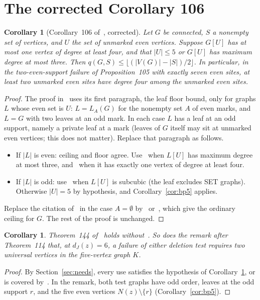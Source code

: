 \documentclass[11pt]{amsart}
\newtheorem{corollary}[theorem]{Corollary}
\theoremstyle{definition}
\begin{document}
\section{The corrected Corollary 106}\label{sec:cor106}

\begin{corollary}[Corollary~106 of~\cite{MR}, corrected]\label{cor:106}
Let $G$ be connected, $S$ a nonempty set of vertices, and $U$ the set of unmarked even vertices.
Suppose $G[U]$ has at most one vertex of degree at least four, and that $|U|\le5$ or $G[U]$ has
maximum degree at most three. Then $q(G,S)\le\lfloor(|V(G)|-|S|)/2\rfloor$. In particular, in the
two-even-support failure of Proposition~105 with exactly seven even sites, at least two unmarked
even sites have degree four among the unmarked even sites.
\end{corollary}

\begin{proof}
The proof in~\cite{MR} uses its first paragraph, the leaf floor bound, only for graphs $L$ whose
even set is $U$: $L=L_A(G)$ for the nonempty set $A$ of even marks, and $L=G$ with two leaves at an
odd mark. In each case $L$ has a leaf at an odd support, namely a private leaf at a mark (leaves
of $G$ itself may sit at unmarked even vertices; this does not matter). Replace that paragraph as
follows.
\begin{itemize}
\item If $|L|$ is even: ceiling and floor agree. Use~\cite[Corollary~14]{BS} when $L[U]$ has maximum
degree at most three, and~\cite[Theorem~5]{FHZ} when it has exactly one vertex of degree at least
four.
\item If $|L|$ is odd: use~\cite[Theorem~13]{BS} when $L[U]$ is subcubic (the leaf excludes SET
graphs). Otherwise $|U|=5$ by hypothesis, and Corollary~\ref{cor:bp5} applies.
\end{itemize}
Replace the citation of~\cite{Shaik} in the case $A=\emptyset$ by~\cite[Corollary~14]{BS}
or~\cite[Theorem~5]{FHZ}, which give the ordinary ceiling for $G$. The rest of the proof is unchanged.
\end{proof}

\begin{corollary}
Theorem~144 of~\cite{MR} holds without~\cite{Shaik}. So does the remark after Theorem~114 that, at
$d_J(z)=6$, a failure of either deletion test requires two universal vertices in the five-vertex
graph $K$.
\end{corollary}

\begin{proof}
By Section~\ref{sec:needs}, every use satisfies the hypothesis of Corollary~\ref{cor:106}, or is
covered by~\cite[Theorem~13]{BS}. In the remark, both test graphs have odd order, leaves at the odd
support $r$, and the five even vertices $N(z)\setminus\{r\}$ (Corollary~\ref{cor:bp5}).
\end{proof}
\end{document}

